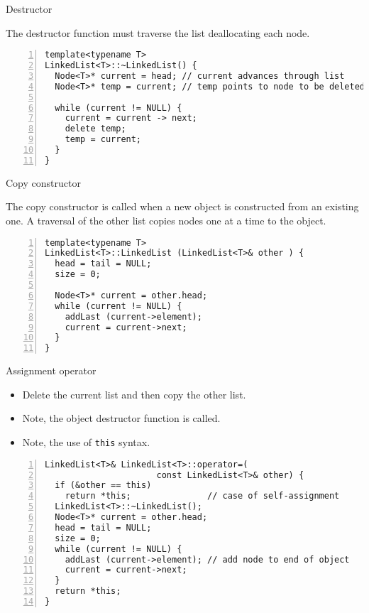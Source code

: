 \documentclass{beamer}
\begin{document}

\begin{frame}[fragile]{Destructor}

The destructor function must traverse the list deallocating each node.

\begin{lstlisting}[numbers=left]
template<typename T>
LinkedList<T>::~LinkedList() {
  Node<T>* current = head; // current advances through list
  Node<T>* temp = current; // temp points to node to be deleted

  while (current != NULL) {
    current = current -> next;
    delete temp;
    temp = current;
  }
}
\end{lstlisting}

\end{frame}


\begin{frame}[fragile]{Copy constructor}

The copy constructor is called when a new object is constructed from
an existing one.  A traversal of the other list copies nodes one at a
time to the object.

\begin{lstlisting}[numbers=left]
template<typename T>
LinkedList<T>::LinkedList (LinkedList<T>& other ) {
  head = tail = NULL;
  size = 0;

  Node<T>* current = other.head;
  while (current != NULL) {
    addLast (current->element);
    current = current->next;
  }
}
\end{lstlisting}

\end{frame}


\begin{frame}[fragile]{Assignment operator}

\begin{itemize}

\item Delete the current list and then copy the other list.

\item Note, the object destructor function is called.

\item Note, the use of \lstinline$this$ syntax.

\end{itemize}

\begin{lstlisting}[numbers=left]
LinkedList<T>& LinkedList<T>::operator=(
                      const LinkedList<T>& other) {
  if (&other == this) 
    return *this;               // case of self-assignment
  LinkedList<T>::~LinkedList();
  Node<T>* current = other.head;
  head = tail = NULL;
  size = 0;
  while (current != NULL) {
    addLast (current->element); // add node to end of object
    current = current->next;
  }
  return *this;
}
\end{lstlisting}

\end{frame}

\end{document}
